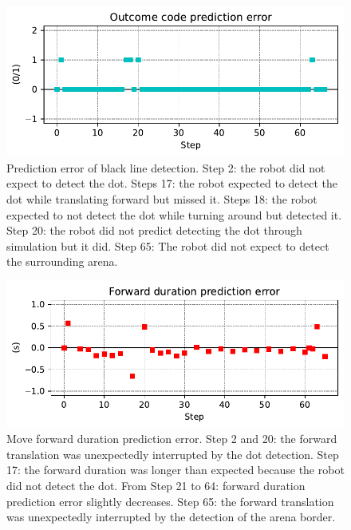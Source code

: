 \documentclass[runningheads]{llncs}
\begin{document}
\begin{figure}
	\includegraphics[width=\textwidth]{01_Outcome_code.pdf}
	\caption{Prediction error of black line detection.
	Step 2: the robot did not expect to detect the dot.
	Steps 17: the robot expected to detect the dot while translating forward but missed it.
	Steps 18: the robot expected to not detect the dot while turning around but detected it.
	Step 20: the robot did not predict detecting the dot through simulation but it did. 
	Step 65: The robot did not expect to detect the surrounding arena. } \label{fig:yaw_pe}
\end{figure}

\begin{figure}
	\includegraphics[width=\textwidth]{07_Forward_duration_pe.pdf}
	\caption{Move forward duration prediction error.
	Step 2 and 20: the forward translation was unexpectedly interrupted by the dot detection.
	Step 17: the forward duration was longer than expected because the robot did not detect the dot.
	From Step 21 to 64: forward duration prediction error slightly decreases. 
	Step 65: the forward translation was unexpectedly interrupted by the detection of the arena border.} \label{fig:yaw_re}
\end{figure}
\end{document}
